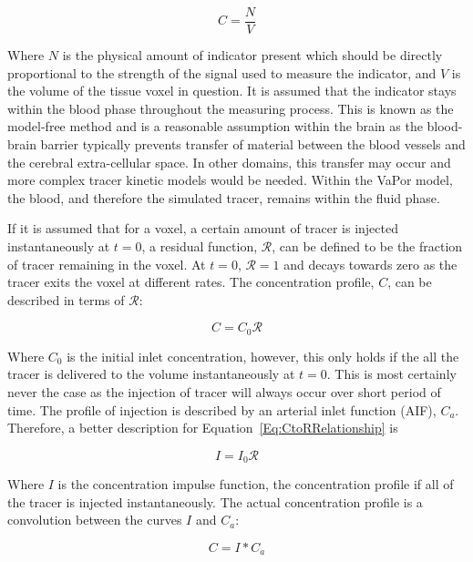 \documentclass[11pt,english,a4paper,twoside,openright]{report}
\begin{document}
{{{{{{{{\begin{equation}
C = \frac{N}{V}
\label{Eq:InitialConcentrationEquation}
\end{equation}

Where $N$ is the physical amount of indicator present which should be directly proportional to the strength of the signal used to measure the indicator, and $V$ is the volume of the tissue voxel in question. It is assumed that the indicator stays within the blood phase throughout the measuring process. This is known as the model-free method and  is a reasonable assumption within the brain as the blood-brain barrier typically prevents transfer of material between the blood vessels and the cerebral extra-cellular space. In other domains, this transfer may occur and more complex tracer kinetic models would be needed. Within the VaPor model, the blood, and therefore the simulated tracer, remains within the fluid phase. 

If it is assumed that for a voxel, a certain amount of tracer is injected instantaneously at $t=0$, a residual function, $\mathcal{R}$, can be defined to be the fraction of tracer remaining in the voxel. At $t=0$, $\mathcal{R}=1$ and decays towards zero as the tracer exits the voxel at different rates. The concentration profile, $C$, can be described in terms of $\mathcal{R}$:

\begin{equation}
C = C_{0}\mathcal{R}
\label{Eq:CtoRRelationship}
\end{equation}

Where $C_{0}$ is the initial inlet concentration, however, this only holds if the all the tracer is delivered to the volume instantaneously at $t=0$. This is most certainly never the case as the injection of tracer will always occur over short period of time. The profile of injection is described by an arterial inlet function (AIF), $C_{a}$. Therefore, a better description for Equation~\ref{Eq:CtoRRelationship} is 

\begin{equation}
I = I_{0}\mathcal{R}
\label{Eq:ItoRRelationship}
\end{equation}

Where $I$ is the concentration impulse function, the concentration profile if all of the tracer is injected instantaneously. The actual concentration profile is a convolution between the curves $I$ and $C_{a}$:

\begin{equation}
C = I*C_{a}
\label{Eq:Convolution}
\end{equation}

}}}}}}}}
\end{document}
